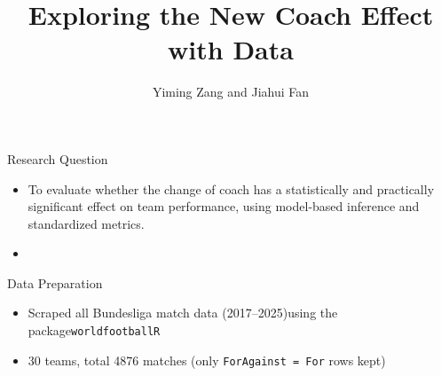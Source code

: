 \documentclass[
  ignorenonframetext,
]{beamer}
\title{Exploring the New Coach Effect with Data}
\author{Yiming Zang and Jiahui Fan}
\date{}
\providecommand{\tightlist}{%
  \setlength{\itemsep}{0pt}\setlength{\parskip}{0pt}}\usepackage{longtable,booktabs,array}
\begin{document}
\frame{\titlepage}


\begin{frame}{Research Question}
\label{research-question}
\begin{itemize}
\item
  To evaluate whether the change of coach has a statistically and
  practically significant effect on team performance, using model-based
  inference and standardized metrics.
\item
\end{itemize}
\end{frame}

\begin{frame}[fragile]{Data Preparation}
\label{data-preparation}
\begin{table}[!h]
\centering
\caption{Example rows around coaching change}
\centering
{}
\end{table}

\begin{itemize}
\tightlist
\item
  Scraped all Bundesliga match data (2017--2025)using the
  package\texttt{worldfootballR}
\item
  30 teams, total 4876 matches (only \texttt{ForAgainst\ =\ For} rows
  kept)
\end{itemize}
\end{frame}
\end{document}

